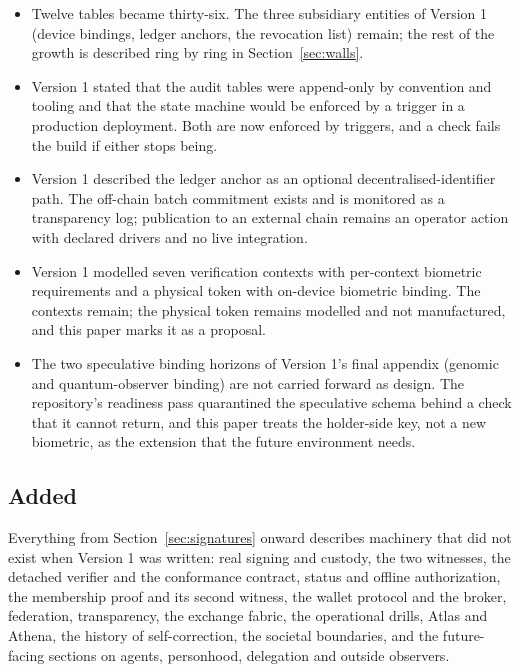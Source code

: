 \begin{itemize}
  \item Twelve tables became thirty-six. The three subsidiary entities of Version 1 (device
    bindings, ledger anchors, the revocation list) remain; the rest of the growth is described ring by
    ring in Section~\ref{sec:walls}.
  \item Version 1 stated that the audit tables were append-only by convention and tooling and that
    the state machine would be enforced by a trigger in a production deployment. Both are now
    enforced by triggers, and a check fails the build if either stops being.
  \item Version 1 described the ledger anchor as an optional decentralised-identifier path. The
    off-chain batch commitment exists and is monitored as a transparency log; publication to an
    external chain remains an operator action with declared drivers and no live integration.
  \item Version 1 modelled seven verification contexts with per-context biometric requirements and a
    physical token with on-device biometric binding. The contexts remain; the physical token remains
    modelled and not manufactured, and this paper marks it as a proposal.
  \item The two speculative binding horizons of Version 1's final appendix (genomic and
    quantum-observer binding) are not carried forward as design. The repository's readiness pass
    quarantined the speculative schema behind a check that it cannot return, and this paper treats
    the holder-side key, not a new biometric, as the extension that the future environment needs.
\end{itemize}

\subsection*{Added}

Everything from Section~\ref{sec:signatures} onward describes machinery that did not exist when
Version 1 was written: real signing and custody, the two witnesses, the detached verifier and the
conformance contract, status and offline authorization, the membership proof and its second witness,
the wallet protocol and the broker, federation, transparency, the exchange fabric, the operational
drills, Atlas and Athena, the history of self-correction, the societal boundaries, and the
future-facing sections on agents, personhood, delegation and outside observers.
